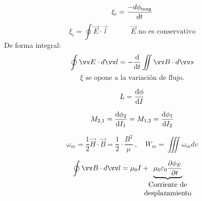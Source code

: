 \documentclass[a4paper]{book}
\begin{document}
\begin{landscape}
\begin{fleqn}
\begin{multicols}{4}
		\[\xi_i = \frac{-d \phi_{\text{mag}}}{dt}\]
		\[\xi_i=\oint{\vec{E}\cdot \vec{l}}\ \qquad \quad \vec{E} \text{ no es conservativo}\]
		\noindent De forma integral:
		\[\oint{\vec{E}\cdot d\vec{l}}=-\dv{}{t}\iint{\vec{B}\cdot d\vec{s}}\]
		\[\xi \text{ se opone a la variación de flujo.}\]

		\[L=\dv{\phi}{I}\]

		\[M_{2,1}=\dv{\phi_2}{I_1}=M_{1,2}=\dv{\phi_1}{I_2}\]

		\[\omega_m = \frac{1}{2}\vec{H}\cdot \vec{B}= \frac{1}{2}\cdot \frac{B^2}{\mu} \ , \quad W_m=\iiint \omega_m dv\]

		\[\oint{\vec{B}\cdot d\vec{l}} = \mu _0I+\!\!\!\!\!\underbrace{\mu_0\varepsilon_0\pdv{\phi_E}{t}}_{ \begin{matrix}
					\text{Corriente de} \\
					\text{desplazamiento}
				\end{matrix}}\]

	\end{multicols}
\end{fleqn}
\end{landscape}

% 
\end{document}
